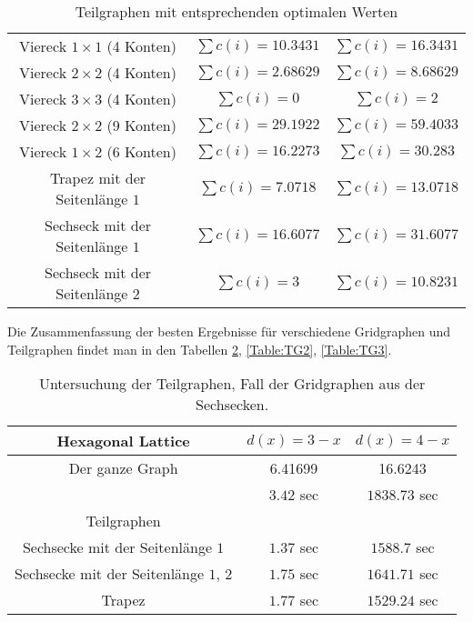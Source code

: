 \documentclass[
	fontsize=12pt,
	paper=a4,
	twoside=false,
	numbers=noenddot,
	plainheadsepline,
	toc=listof,
	toc=bibliography
]{scrartcl}
\begin{document}
\begin{itemize}
\begin{table}[htbp]
\begin{tabular}{|c|c|c|}
		Viereck $1\times 1$ (4 Konten) &  $\sum{c(i)}=10.3431$ & $\sum{c(i)}=16.3431$ \\ 
		Viereck $2\times 2$ (4 Konten) &  $\sum{c(i)}=2.68629$ & $\sum{c(i)}=8.68629$ \\ 
		Viereck $3\times 3$ (4 Konten) &  $\sum{c(i)}=0$ & $\sum{c(i)}=2$ \\ 
		
		Viereck $2\times 2$ (9 Konten) &  $\sum{c(i)}=29.1922$ & $\sum{c(i)}=59.4033$ \\  
		
		Viereck $1\times 2$ (6 Konten) &  $\sum{c(i)}=16.2273$ & $\sum{c(i)}=30.283$ \\  \hline
		
		Trapez mit der Seitenlänge $1$ &  $\sum{c(i)}=7.0718$ & $\sum{c(i)}=13.0718$ \\ \hline
		
		Sechseck mit der Seitenlänge $1$ & $\sum{c(i)}=16.6077$ & $\sum{c(i)}=31.6077$ \\
		Sechseck mit der Seitenlänge $2$ & $\sum{c(i)}=3$ & $\sum{c(i)}=10.8231$ \\ \hline
		
	\end{tabular}
	\caption{Teilgraphen mit entsprechenden optimalen Werten} 
	\label{Table:TG0}
	\end{table}
	
	Die Zusammenfassung der besten Ergebnisse für verschiedene Gridgraphen und Teilgraphen findet man in den Tabellen \ref{Table:TG1}, \ref{Table:TG2}, \ref{Table:TG3}.

	\begin{table}[htbp]
	\centering
	\begin{tabular}{|c|c|c|}
	\hline Hexagonal Lattice& $d(x)=3-x$  & $d(x)=4-x$\\ \hline 
		Der ganze Graph	&  6.41699	& 16.6243 \\ 
			& $3.42$ sec	& $1838.73$ sec \\ \hline
		Teilgraphen & & \\\hline
		Sechsecke mit der Seitenlänge $1$& $1.37$ sec	&  $1588.7$ sec \\ \hline
		Sechsecke mit der Seitenlänge $1$, $2$	& $1.75$ sec	&  $1641.71$ sec \\ \hline
		Trapez& $1.77$ sec	&  $1529.24$ sec \\ \hline
	\end{tabular}
	\caption{Untersuchung der Teilgraphen, Fall der Gridgraphen aus der Sechsecken.} 
	\label{Table:TG1}
	\end{table}
	

\end{itemize}
\end{document}
